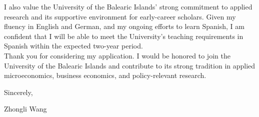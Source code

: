 \documentclass{nfr}
\begin{document}
I also value the University of the Balearic Islands’ strong commitment to applied research and its supportive environment for early-career scholars. 
Given my fluency in English and German, and my ongoing efforts to learn Spanish, I am confident that I will be able to meet the University’s teaching requirements in Spanish within the expected two-year period.\\

Thank you for considering my application. 
I would be honored to join the University of the Balearic Islands and contribute to its strong tradition in applied microeconomics, business economics, and policy-relevant research.\\
\vspace{10mm}

\noindent Sincerely,\\
\vspace{19mm}

\noindent Zhongli Wang

\vspace{10mm}



\end{document}
